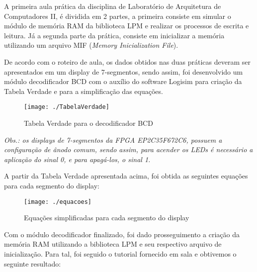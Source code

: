 \documentclass[12pt, a4paper]{article}
\begin{document}
    \par A primeira aula prática da disciplina de Laboratório de Arquitetura de Computadores II, é dividida em 2 partes, a primeira consiste em simular o módulo de memória RAM da biblioteca LPM e realizar os processos de escrita e leitura. Já a segunda parte da prática, consiste em inicializar a memória utilizando um arquivo MIF (\textit{Memory Inicialization File}).
    
    \vspace{\baselineskip}

	\par De acordo com o roteiro de aula, os dados obtidos nas duas práticas deveram ser apresentados em um display de 7-segmentos, sendo assim, foi desenvolvido um módulo decodificador BCD com o auxílio do software Logisim para criação da Tabela Verdade e para a simplificação das equações.
	
	\vspace{\baselineskip}
    
    \begin{figure}[H]
    	\centering
    	\texttt{[image: ./TabelaVerdade]}
    	\caption{Tabela Verdade para o decodificador BCD}
    	\label{fig: tabela verdade}
    \end{figure}
    
    \par \textit{Obs.: os displays de 7-segmentos da FPGA EP2C35F672C6, possuem a configuração de ânodo comum, sendo assim, para acender os LEDs é necessário a aplicação do sinal 0, e para apagá-los, o sinal 1.}

    \vspace{\baselineskip}
    
    \par A partir da Tabela Verdade apresentada acima, foi obtida as seguintes equações para cada segmento do display:
    
    \begin{figure}[H]
    	\centering
    	\texttt{[image: ./equacoes]}
    	\caption{Equações simplificadas para cada segmento do display}
    	\label{fig: equacoes}
    \end{figure}

    \vspace{\baselineskip}
    
    \par Com o módulo decodificador finalizado, foi dado prosseguimento a criação da memória RAM utilizando a biblioteca LPM e seu respectivo arquivo de inicialização. Para tal, foi seguido o tutorial fornecido em sala e obtivemos o seguinte resultado:
    
\end{document}
